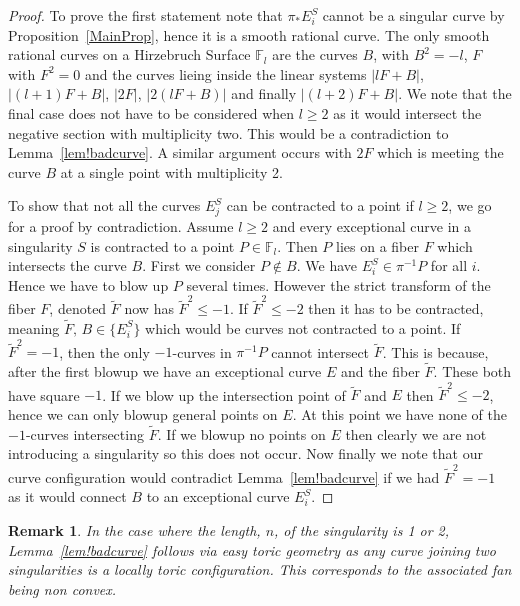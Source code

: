 \documentclass[12pt]{amsbook}
\theoremstyle{plain}
\newtheorem*{rem}{Remark}
\newcommand{\mb}[1]{\mathbb{#1}}
\newcommand{\wt}[1]{\widetilde #1}
\begin{document}
\begin{proof} 
To prove the first statement note that $\pi_* E_i^S$ cannot be a singular curve by Proposition~\ref{MainProp}, hence it is a smooth rational curve. The only smooth rational curves on a Hirzebruch Surface $\mb{F}_l$ are the curves $B$, with $B^2 = -l$, $F$ with $F^2 = 0$ and the curves lieing inside the linear systems $|lF + B|$,  $|(l+1)F + B|$, $|2F|$, $|2(lF+B)|$  and finally $|(l+2)F + B|$. We note that the final case does not have to be considered when $l \ge 2$ as it would intersect the negative section with multiplicity two. This would be a contradiction to Lemma~\ref{lem!badcurve}. A similar argument occurs with $2F$ which is meeting the curve $B$ at a single point with multiplicity 2.



To show that not all the curves $E_j^S$ can be contracted to a point if $l \geq 2$, we go for a proof by contradiction. Assume $l \ge 2$ and every exceptional curve in a singularity $S$ is contracted to a point $P \in \mb{F}_l$. Then $P$ lies on a fiber $F$ which intersects the curve $B$. First we consider $P \not\in B$. We have $E_i^S \in \pi^{-1}{P}$ for all $i$. Hence we have to blow up $P$ several times. However the strict transform of the fiber $F$, denoted $\wt{F}$ now has $\wt{F}^2 \leq -1$. If $\wt{F}^2 \leq -2$ then it has to be contracted, meaning $\wt{F}, \, B \in \{ E_i^S \}$ which would be curves not contracted to a point. If $\wt{F}^2 = -1$, then the only $-1$-curves in $\pi^{-1}{P}$ cannot intersect $\wt{F}$. This is because, after the first blowup we have an exceptional curve $E$ and the fiber $\wt{F}$. These both have square $-1$. If we blow up the intersection point of $\wt{F}$ and $E$ then $\wt{F}^2 \leq -2$, hence we can only blowup general points on $E$. At this point we have none of the $-1$-curves intersecting $\wt{F}$. If we blowup no points on $E$ then clearly we are not introducing a singularity so this does not occur. Now finally we note that our curve configuration would contradict Lemma~\ref{lem!badcurve} if we had $\wt{F}^2 = -1$ as it would connect $B$ to an exceptional curve $E_i^S$. 

\end{proof}

\begin{rem}
In the case where the length, $n$, of the singularity is 1 or 2, Lemma~\ref{lem!badcurve} follows via easy toric geometry as any curve joining two singularities is a locally toric configuration. This corresponds to the associated fan being non convex. 
\end{rem}
\end{document}
